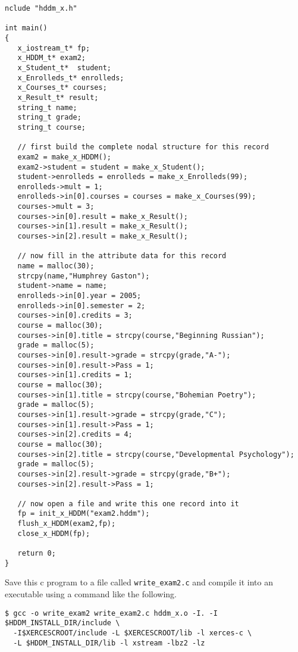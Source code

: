\documentclass{revtex4}
\begin{document}
\vspace{0.5cm}
\begin{minipage}{12cm}
\begin{verbatim}
nclude "hddm_x.h"

int main()
{
   x_iostream_t* fp;
   x_HDDM_t* exam2;
   x_Student_t*  student;
   x_Enrolleds_t* enrolleds;
   x_Courses_t* courses;
   x_Result_t* result;
   string_t name;
   string_t grade;
   string_t course;

   // first build the complete nodal structure for this record
   exam2 = make_x_HDDM();
   exam2->student = student = make_x_Student();
   student->enrolleds = enrolleds = make_x_Enrolleds(99);
   enrolleds->mult = 1;
   enrolleds->in[0].courses = courses = make_x_Courses(99);
   courses->mult = 3;
   courses->in[0].result = make_x_Result();
   courses->in[1].result = make_x_Result();
   courses->in[2].result = make_x_Result();

   // now fill in the attribute data for this record
   name = malloc(30);
   strcpy(name,"Humphrey Gaston");
   student->name = name;
   enrolleds->in[0].year = 2005;
   enrolleds->in[0].semester = 2;
   courses->in[0].credits = 3;
   course = malloc(30);
   courses->in[0].title = strcpy(course,"Beginning Russian");
   grade = malloc(5);
   courses->in[0].result->grade = strcpy(grade,"A-");
   courses->in[0].result->Pass = 1;
   courses->in[1].credits = 1;
   course = malloc(30);
   courses->in[1].title = strcpy(course,"Bohemian Poetry");
   grade = malloc(5);
   courses->in[1].result->grade = strcpy(grade,"C");
   courses->in[1].result->Pass = 1;
   courses->in[2].credits = 4;
   course = malloc(30);
   courses->in[2].title = strcpy(course,"Developmental Psychology");
   grade = malloc(5);
   courses->in[2].result->grade = strcpy(grade,"B+");
   courses->in[2].result->Pass = 1;

   // now open a file and write this one record into it
   fp = init_x_HDDM("exam2.hddm");
   flush_x_HDDM(exam2,fp);
   close_x_HDDM(fp);

   return 0;
}
\end{verbatim}
\end{minipage}
\vspace{0.5cm}

Save this c program to a file called \texttt{write\_exam2.c} and compile it
into an executable using a command like the following.

\vspace{0.5cm}
\begin{minipage}{12cm}
\begin{verbatim}
$ gcc -o write_exam2 write_exam2.c hddm_x.o -I. -I $HDDM_INSTALL_DIR/include \
  -I$XERCESCROOT/include -L $XERCESCROOT/lib -l xerces-c \
  -L $HDDM_INSTALL_DIR/lib -l xstream -lbz2 -lz
\end{verbatim}
\end{minipage}
\vspace{0.5cm}
\end{document}
